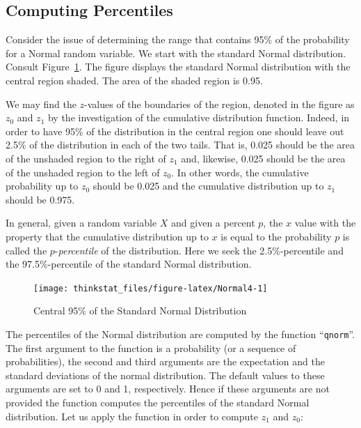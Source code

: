 \documentclass[]{krantz}
\theoremstyle{definition}
\theoremstyle{definition}
\theoremstyle{definition}
\theoremstyle{remark}
\begin{document}
\subsection{Computing Percentiles}\label{computing-percentiles}

Consider the issue of determining the range that contains 95\% of the
probability for a Normal random variable. We start with the standard
Normal distribution. Consult Figure~\ref{fig:Normal4}. The figure
displays the standard Normal distribution with the central region
shaded. The area of the shaded region is 0.95.

We may find the \(z\)-values of the boundaries of the region, denoted in
the figure as \(z_0\) and \(z_1\) by the investigation of the cumulative
distribution function. Indeed, in order to have 95\% of the distribution
in the central region one should leave out 2.5\% of the distribution in
each of the two tails. That is, 0.025 should be the area of the unshaded
region to the right of \(z_1\) and, likewise, 0.025 should be the area
of the unshaded region to the left of \(z_0\). In other words, the
cumulative probability up to \(z_0\) should be 0.025 and the cumulative
distribution up to \(z_1\) should be 0.975.

In general, given a random variable \(X\) and given a percent \(p\), the
\(x\) value with the property that the cumulative distribution up to
\(x\) is equal to the probability \(p\) is called the
\(p\)-\emph{percentile} of the distribution. Here we seek the
2.5\%-percentile and the 97.5\%-percentile of the standard Normal
distribution.

\begin{figure}

{\centering \texttt{[image: thinkstat\_files/figure-latex/Normal4-1]} 

}

\caption{Central 95$\%$ of the Standard Normal Distribution}\label{fig:Normal4}
\end{figure}

The percentiles of the Normal distribution are computed by the function
``\texttt{qnorm}''. The first argument to the function is a probability
(or a sequence of probabilities), the second and third arguments are the
expectation and the standard deviations of the normal distribution. The
default values to these arguments are set to 0 and 1, respectively.
Hence if these arguments are not provided the function computes the
percentiles of the standard Normal distribution. Let us apply the
function in order to compute \(z_1\) and \(z_0\):
\end{document}
